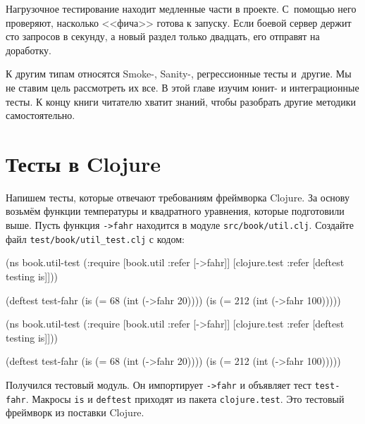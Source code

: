 
Нагрузочное тестирование находит медленные части в проекте. С~помощью него
проверяют, насколько <<фича>> готова к запуску. Если боевой сервер держит сто
запросов в секунду, а новый раздел только двадцать, его отправят на доработку.

К другим типам относятся Smoke-, Sanity-, регрессионные тесты и~другие. Мы не
ставим цель рассмотреть их все. В этой главе изучим юнит- и интеграционные
тесты. К концу книги читателю хватит знаний, чтобы разобрать другие методики
самостоятельно.

\section{Тесты в Clojure}

Напишем тесты, которые отвечают требованиям фреймворка Clojure. За основу
возьмём функции температуры и квадратного уравнения, которые подготовили
выше. Пусть функция \verb|->fahr| находится в модуле
\verb|src/book/util.clj|. Создайте файл \verb|test/book/util_test.clj| с кодом:


\ifx\devicetype\mobile

\begin{english}
  \begin{clojure}
(ns book.util-test
  (:require
   [book.util :refer [->fahr]]
   [clojure.test :refer
    [deftest testing is]]))

(deftest test-fahr
  (is (= 68 (int (->fahr 20))))
  (is (= 212 (int (->fahr 100)))))
  \end{clojure}
\end{english}

\else

\begin{english}
  \begin{clojure}
(ns book.util-test
  (:require [book.util :refer [->fahr]]
            [clojure.test :refer [deftest testing is]]))

(deftest test-fahr
  (is (= 68 (int (->fahr 20))))
  (is (= 212 (int (->fahr 100)))))
  \end{clojure}
\end{english}

\fi

Получился тестовый модуль. Он импортирует \verb|->fahr| и объявляет тест
\verb|test-fahr|. Макросы \verb|is| и \verb|deftest| приходят из пакета
\verb|clojure.test|. Это тестовый фреймворк из поставки Clojure.

